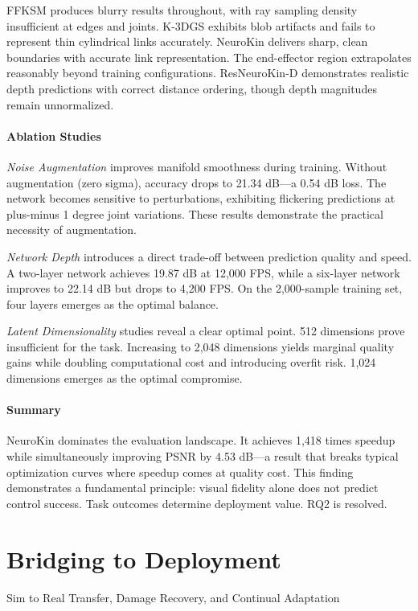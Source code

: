 ﻿\documentclass[11pt,a4paper]{article}
\begin{document}
FFKSM produces blurry results throughout, with ray sampling density insufficient at edges and joints. K-3DGS exhibits blob artifacts and fails to represent thin cylindrical links accurately. NeuroKin delivers sharp, clean boundaries with accurate link representation. The end-effector region extrapolates reasonably beyond training configurations. ResNeuroKin-D demonstrates realistic depth predictions with correct distance ordering, though depth magnitudes remain unnormalized.

\paragraph{Ablation Studies}
\emph{Noise Augmentation} improves manifold smoothness during training. Without augmentation (zero sigma), accuracy drops to 21.34 dB—a 0.54 dB loss. The network becomes sensitive to perturbations, exhibiting flickering predictions at plus-minus 1 degree joint variations. These results demonstrate the practical necessity of augmentation.

\emph{Network Depth} introduces a direct trade-off between prediction quality and speed. A two-layer network achieves 19.87 dB at 12,000 FPS, while a six-layer network improves to 22.14 dB but drops to 4,200 FPS. On the 2,000-sample training set, four layers emerges as the optimal balance.

\emph{Latent Dimensionality} studies reveal a clear optimal point. 512 dimensions prove insufficient for the task. Increasing to 2,048 dimensions yields marginal quality gains while doubling computational cost and introducing overfit risk. 1,024 dimensions emerges as the optimal compromise.

\paragraph{Summary}
NeuroKin dominates the evaluation landscape. It achieves 1,418 times speedup while simultaneously improving PSNR by 4.53 dB—a result that breaks typical optimization curves where speedup comes at quality cost. This finding demonstrates a fundamental principle: visual fidelity alone does not predict control success. Task outcomes determine deployment value. RQ2 is resolved.

\section{Bridging to Deployment} Sim to Real Transfer, Damage Recovery, and Continual Adaptation
\end{document}
